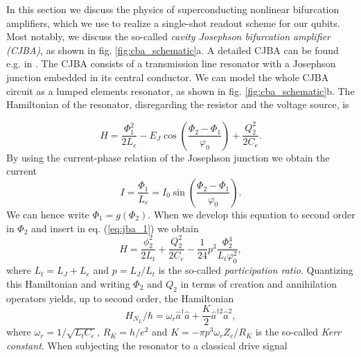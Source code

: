 In this section we discuss the physics of superconducting nonlinear bifurcation amplifiers, which we use to realize a single-shot readout scheme for our qubits. Most notably, we discuss the so-called {\it cavity Josephson bifurcation amplifier (CJBA)}, as shown in fig. \ref{fig:cba_schematic}a. A detailed CJBA can be found e.g. in \cite{palacios-laloy_superconducting_2010}. The CJBA consists of a transmission line resonator with a Josephson junction embedded in its central conductor. We can model the whole CJBA circuit as a lumped elements resonator, as shown in fig. \ref{fig:cba_schematic}b. The Hamiltonian of the resonator, disregarding the resistor and the voltage source, is

%
\begin{equation}
H = \frac{\Phi_1^2}{2L_e}-E_J\cos{\left(\frac{\Phi_2-\Phi_1}{\varphi_0}\right)}+\frac{Q_2^2}{2C_e}. \label{eq:jba_1}
\end{equation}
%
By using the current-phase relation of the Josephson junction we obtain the current
%
\begin{equation}
I = \frac{\Phi_1}{L_e} = I_0 \sin{\left(\frac{\Phi_2-\Phi_1}{\varphi_0}\right)}.
\end{equation}
%
We can hence write $\Phi_1 = g(\Phi_2)$. When we develop this equation to second order in $\Phi_2$ and insert in eq. (\ref{eq:jba_1}) we obtain
%
\begin{equation}
H = \frac{\phi_2^2}{2L_t}+\frac{Q_2^2}{2C_e}-\frac{1}{24}p^3\frac{\Phi_2^4}{L_t \varphi_0^2},
\end{equation}
%
where $L_t = L_J+L_e$ and $p=L_J/L_t$ is the so-called {\it participation ratio}. Quantizing this Hamiltonian and writing $\Phi_2$ and $Q_2$ in terms of creation and annihilation operators yields, up to second order, the Hamiltonian
%
\begin{equation}
H_{N_L}/\hbar = \omega_r \hat{a}^\dagger \hat{a}+\frac{K}{2}\hat{a}^{\dagger 2}\hat{a}^2,
\end{equation}
%
where $\omega_r=1/\sqrt{L_t C_e}$, $R_K=h/e^2$ and $K=-\pi p^3 \omega_r Z_e / R_K$ is the so-called {\it Kerr constant}. When subjecting the resonator to a classical drive signal

